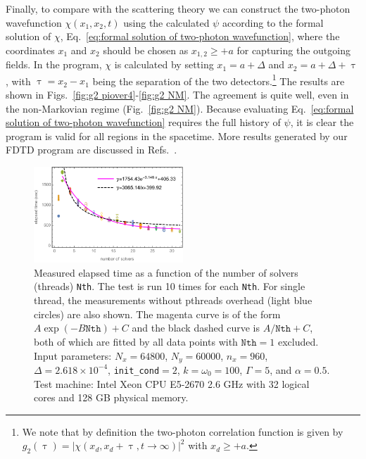 \documentclass[12pt,letter,onecolumn,notitlepage]{article}
\begin{document}
Finally, to compare with the scattering theory we can construct the two-photon wavefunction $\chi(x_1, x_2, t)$ using the calculated $\psi$ according to the formal solution of $\chi$, Eq.~\eqref{eq:formal solution of two-photon wavefunction},
where the coordinates $x_1$ and $x_2$ should be chosen as $x_{1,2}\geq +a$ for capturing the outgoing fields. In the program, $\chi$ is calculated by setting $x_1=a+\Delta$ and $x_2=a+\Delta+\uptau$, with $\uptau=x_2-x_1$ being the separation of the two detectors.\footnote{We note that by definition the two-photon correlation function is given by $g_2(\uptau) = |\chi(x_d, x_d+\uptau, t\rightarrow\infty)|^2$ with $x_d\geq+a$.} The results are shown in Figs.~\ref{fig:g2 piover4}-\ref{fig:g2 NM}. The agreement is quite well, even in the non-Markovian regime (Fig.~\ref{fig:g2 NM}). Because evaluating Eq.~\eqref{eq:formal solution of two-photon wavefunction} requires the full history of $\psi$, it is clear the program is valid for all regions in the spacetime.
More results generated by our FDTD program are discussed in Refs.~\cite{FangNM17,FangPRA15err,OurBIC}. 

\begin{figure}[htbp]
	\centering
	\includegraphics[width=0.5\textwidth]{FDTD+pthreads_time_measurement2}
	\caption{Measured elapsed time as a function of the number of solvers (threads) \texttt{Nth}. The test is run 10 times for each \texttt{Nth}. For single thread, the measurements without pthreads overhead (light blue circles) are also shown. The magenta curve is of the form $A \exp(-B \texttt{Nth})+C$ and the black dashed curve is $A/\texttt{Nth}+C$, both of which are fitted by all data points with $\texttt{Nth}=1$ excluded. Input parameters: $N_x=64800$, $N_y=60000$, $n_x=960$, $\Delta=2.618\times10^{-4}$, \texttt{init\_cond}$=2$, $k=\omega_0=100$, $\Gamma=5$, and $\alpha=0.5$. Test machine: Intel Xeon CPU E5-2670 \@ 2.6 GHz with 32 logical cores and 128 GB physical memory.}
	\label{fig: elapsed time for multithread}
\end{figure}
\end{document}
